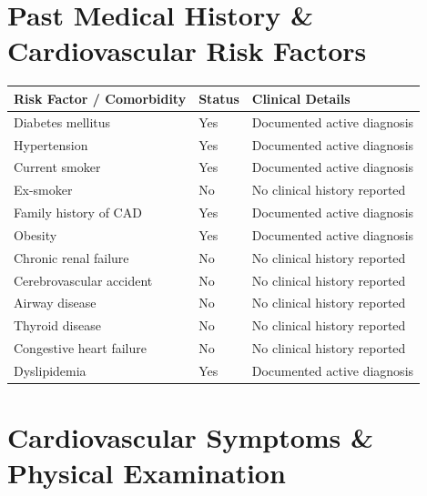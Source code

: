 \documentclass[10pt,a4paper]{article}
\begin{document}
\vspace{8pt}

\section*{Past Medical History \& Cardiovascular Risk Factors}

\begin{tabular}{@{} p{6.8cm} p{2.8cm} p{5.5cm} @{}}
  \toprule
  \textbf{Risk Factor / Comorbidity} & \textbf{Status} & \textbf{Clinical Details} \\
  \midrule
  Diabetes mellitus & Yes & Documented active diagnosis \\
  Hypertension & Yes & Documented active diagnosis \\
  Current smoker & Yes & Documented active diagnosis \\
  Ex-smoker & No & No clinical history reported \\
  Family history of CAD & Yes & Documented active diagnosis \\
  Obesity & Yes & Documented active diagnosis \\
  Chronic renal failure & No & No clinical history reported \\
  Cerebrovascular accident & No & No clinical history reported \\
  Airway disease & No & No clinical history reported \\
  Thyroid disease & No & No clinical history reported \\
  Congestive heart failure & No & No clinical history reported \\
  Dyslipidemia & Yes & Documented active diagnosis \\
  \bottomrule
\end{tabular}

\vspace{8pt}

\section*{Cardiovascular Symptoms \& Physical Examination}
\end{document}
